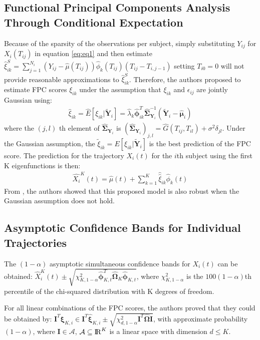 \documentclass[11pt]{report}
\begin{document}
\subsection*{Functional Principal Components Analysis Through Conditional Expectation}
Because of the sparsity of the observations per subject, simply substituting $Y_{ij}$ for $X_i(T_{ij})$ in equation \eqref{eq:eq1} and then estimate $\hat{\xi}_{ik}^S = \sum_{j=1}^{N_i}(Y_{ij}-\hat{\mu}(T_{ij}))\hat{\phi}_k(T_{ij})(T_{ij}-T_{i,j-1})$ setting $T_{i0}=0$ will not provide reasonable approximations to $\hat{\xi}_{ik}^S$. 
Therefore, the authors proposed to estimate FPC scores $\xi_{ik}$ under the assumption that $\xi_{ik}$ and $\epsilon_{ij}$ are jointly Gaussian using:
\begin{align}
	\label{eq:eq5}
	\hat{\xi}_{ik} = \widehat{E}{[\xi_{ik}|\widetilde{\pmb{Y}}_i]} = \hat{\lambda}_k\hat{\pmb{\phi}}_{ik}^T\hat{\pmb{\Sigma}}_{\pmb{Y}_i}^{-1}(\tilde{\pmb{Y}}_i - \hat{\pmb{\mu}}_i)
\end{align}
where the $(j,l)$ th element of $\hat{\mathbf{\Sigma}}_{\mathbf{Y}_i}$ is $(\hat{\mathbf{\Sigma}}_{\mathbf{Y}_i})_{j,l} = \hat{G}(T_{ij}, T_{il}) + \sigma^2\delta_{jl}$. Under the Gaussian assumption, the $\tilde{\xi}_{ik} = E[\xi_{ik}|\widetilde{\pmb{Y}}_i]$ is the best prediction of the FPC score. 
The prediction for the trajectory $X_i(t)$ for the $i$th subject using the first K eigenfunctions is then:
\begin{align}
	\label{eq:eq6}
	\widehat{X_i}^K(t) = \hat{\mu}(t)+\sum_{k=1}^{K}\hat{\hat{\xi}}_{ik}\hat{\phi}_k(t)
\end{align}
From , the authors showed that this proposed model is also robust when the Gaussian assumption does not hold. 


\subsection*{Asymptotic Confidence Bands for Individual Trajectories}
The $(1-\alpha)$ asymptotic simultaneous confidence bands for $X_i(t)$ can be obtained:
$
	\widehat{X}_i^K(t) \pm \sqrt{\chi^2_{K,1-\alpha}\hat{\pmb{\phi}}_{K,t}^T\widehat{\pmb{\Omega}}_K\hat{\pmb{\phi}}_{K,t}}
$, 
where $\chi^2_{K,1-\alpha}$ is the $100(1-\alpha)$th percentile of the chi-squared distribution with K degrees of freedom. 

For all linear combinations of the FPC scores, the authors proved that they could be obtained by:
$
	\pmb{I}^T\pmb{\xi}_{K,i} \in \pmb{I}^T\hat{\pmb{\xi}}_{K,i} \pm \sqrt{\chi^2_{d,1-\alpha}\pmb{I}^T\widehat{\pmb{\Omega}}\pmb{I}}
$, 
with approximate probability $(1-\alpha)$, where $\mathbf{I}\in \mathcal{A}$, $\mathcal{A} \subseteq {\rm I\!R}^K$ is a linear space with dimension $d\leq K$.
\end{document}
